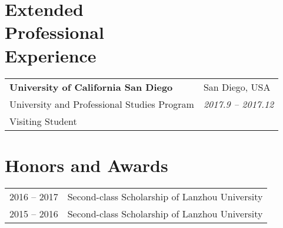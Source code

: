 \documentclass[margin,line,pifont,palatino,courier]{res}
\begin{document}
\begin{resume}
%		
		
		\section{\sc Extended\\Professional\\Experience}
		
		\vspace{.05in}
		\begin{tabular}{@{}p{3.4in}p{2.0in}}
			{\bf University of California San Diego} & {\sc San Diego, USA} \\
			University and Professional Studies Program & {\sl 2017.9 -- 2017.12} \\
			Visiting Student
		\end{tabular}


		\section{\sc Honors and Awards}
		
		\begin{tabular}{@{}p{0.8in}p{4in}}
			2016 -- 2017 & Second-class Scholarship of Lanzhou University \\
			2015 -- 2016 & Second-class Scholarship of Lanzhou University \\
		\end{tabular}
	

\end{resume}
\end{document}
